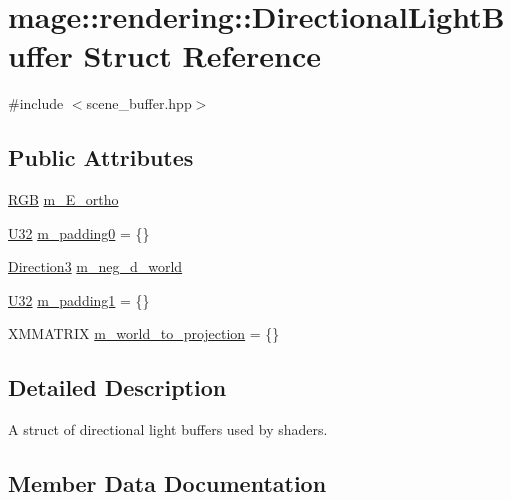 \hypertarget{structmage_1_1rendering_1_1_directional_light_buffer}{}\section{mage\+:\+:rendering\+:\+:Directional\+Light\+Buffer Struct Reference}
\label{structmage_1_1rendering_1_1_directional_light_buffer}


{\ttfamily \#include $<$scene\+\_\+buffer.\+hpp$>$}

\subsection*{Public Attributes}
\begin{DoxyCompactItemize}
\item 
\mbox{\hyperlink{structmage_1_1_r_g_b}{R\+GB}} \mbox{\hyperlink{structmage_1_1rendering_1_1_directional_light_buffer_a95dfc58f116bfa54ab2a9b812bc9d5e3}{m\+\_\+\+E\+\_\+ortho}}
\item 
\mbox{\hyperlink{namespacemage_aa5d6eaabaac3cdd01873d6a3d27e90f3}{U32}} \mbox{\hyperlink{structmage_1_1rendering_1_1_directional_light_buffer_a82d9a78edf5562c3ce041d1a2a7b6a3e}{m\+\_\+padding0}} = \{\}
\item 
\mbox{\hyperlink{structmage_1_1_direction3}{Direction3}} \mbox{\hyperlink{structmage_1_1rendering_1_1_directional_light_buffer_a44ae081673f5dde10e305a20581e31ef}{m\+\_\+neg\+\_\+d\+\_\+world}}
\item 
\mbox{\hyperlink{namespacemage_aa5d6eaabaac3cdd01873d6a3d27e90f3}{U32}} \mbox{\hyperlink{structmage_1_1rendering_1_1_directional_light_buffer_a9e86dcc4f68340eb64408cf638996a69}{m\+\_\+padding1}} = \{\}
\item 
X\+M\+M\+A\+T\+R\+IX \mbox{\hyperlink{structmage_1_1rendering_1_1_directional_light_buffer_ae1c5a43c5dca80be889661a54fb3910b}{m\+\_\+world\+\_\+to\+\_\+projection}} = \{\}
\end{DoxyCompactItemize}


\subsection{Detailed Description}
A struct of directional light buffers used by shaders. 

\subsection{Member Data Documentation}
\mbox{\label{structmage_1_1rendering_1_1_directional_light_buffer_a95dfc58f116bfa54ab2a9b812bc9d5e3}} 
